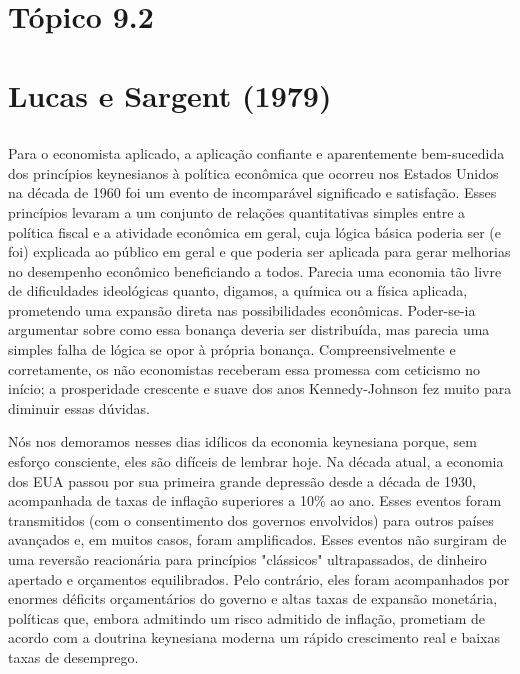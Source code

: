 \documentclass[12pt]{article}
\begin{document}
\newpage
\section*{\textbf{Tópico 9.2}}
\section{\textbf{Lucas e Sargent (1979)}}
\subsection{}

Para o economista aplicado, a aplicação confiante e aparentemente bem-sucedida dos princípios keynesianos à política econômica que ocorreu nos Estados Unidos na década de 1960 foi um evento de incomparável significado e satisfação. Esses princípios levaram a um conjunto de relações quantitativas simples entre a política fiscal e a atividade econômica em geral, cuja lógica básica poderia ser (e foi) explicada ao público em geral e que poderia ser aplicada para gerar melhorias no desempenho econômico beneficiando a todos. Parecia uma economia tão livre de dificuldades ideológicas quanto, digamos, a química ou a física aplicada, prometendo uma expansão direta nas possibilidades econômicas. Poder-se-ia argumentar sobre como essa bonança deveria ser distribuída, mas parecia uma simples falha de lógica se opor à própria bonança. Compreensivelmente e corretamente, os não economistas receberam essa promessa com ceticismo no início; a prosperidade crescente e suave dos anos Kennedy-Johnson fez muito para diminuir essas dúvidas.

Nós nos demoramos nesses dias idílicos da economia keynesiana porque, sem esforço consciente, eles são difíceis de lembrar hoje. Na década atual, a economia dos EUA passou por sua primeira grande depressão desde a década de 1930, acompanhada de taxas de inflação superiores a 10\% ao ano. Esses eventos foram transmitidos (com o consentimento dos governos envolvidos) para outros países avançados e, em muitos casos, foram amplificados. Esses eventos não surgiram de uma reversão reacionária para princípios "clássicos" ultrapassados, de dinheiro apertado e orçamentos equilibrados. Pelo contrário, eles foram acompanhados por enormes déficits orçamentários do governo e altas taxas de expansão monetária, políticas que, embora admitindo um risco admitido de inflação, prometiam de acordo com a doutrina keynesiana moderna um rápido crescimento real e baixas taxas de desemprego.
\end{document}
